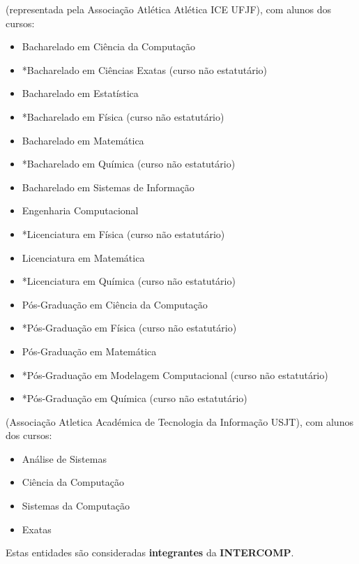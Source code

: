 \begin{article}
\begin{description}[noitemsep]
		\item[UFJF] (representada pela Associação Atlética Atlética ICE UFJF), com alunos dos cursos:
		\begin{itemize}[noitemsep]
			\item Bacharelado em Ciência da Computação
			\item *Bacharelado em Ciências Exatas (curso não estatutário)
			\item Bacharelado em Estatística
			\item *Bacharelado em Física (curso não estatutário)
			\item Bacharelado em Matemática
			\item *Bacharelado em Química (curso não estatutário)
			\item Bacharelado em Sistemas de Informação
			\item Engenharia Computacional
			\item *Licenciatura em Física (curso não estatutário)
			\item Licenciatura em Matemática
			\item *Licenciatura em Química (curso não estatutário)
			\item Pós-Graduação em Ciência da Computação
			\item *Pós-Graduação em Física (curso não estatutário)
			\item Pós-Graduação em Matemática
			\item *Pós-Graduação em Modelagem Computacional (curso não estatutário)
			\item *Pós-Graduação em Química (curso não estatutário)
		\end{itemize}

		\item[USJT - AAATIUSJT] (Associação Atletica Académica de Tecnologia da Informação USJT), com
		alunos dos cursos:
		\begin{itemize}[noitemsep]
			\item Análise de Sistemas
			\item Ciência da Computação
			\item Sistemas da Computação
			\item Exatas
		\end{itemize}
	\end{description}

	\begin{xparagraph}
		Estas entidades são consideradas \textbf{integrantes} da \textbf{INTERCOMP}.
	\end{xparagraph}


\end{article}
